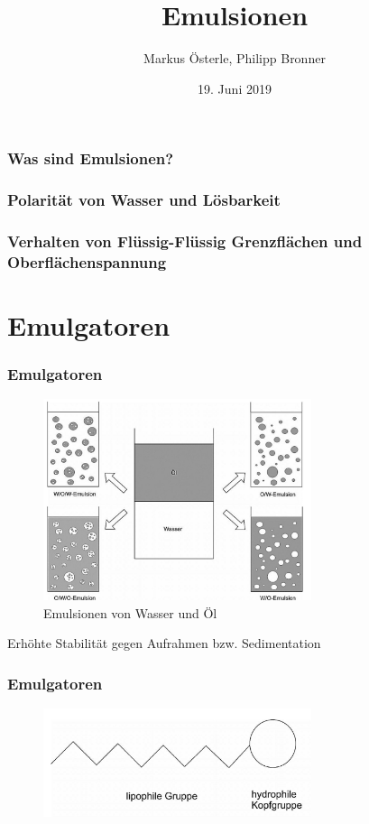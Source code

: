 \documentclass{beamer} %
\title[Emulsionen ]{Emulsionen}
\subtitle[Seminar Physik in der Küche]{}
\date[19. Juni 2019]{19. Juni 2019}
\author[Markus, Phillip und Kim]{Markus \"Osterle, Philipp Bronner}
\begin{document}
\begin{frame}
\titlepage
\end{frame}
\begin{frame}
\frametitle{Was sind Emulsionen?}
\end{frame}

\begin{frame}
\frametitle{Polarität von Wasser und Lösbarkeit}
\end{frame}

\begin{frame}
\frametitle{Verhalten von Flüssig-Flüssig Grenzflächen und Oberflächenspannung}
\end{frame}

\section{Emulgatoren}
\begin{frame}
\frametitle{Emulgatoren}
\begin{figure}
\centering
\includegraphics[width = 0.7\textwidth]{Emulsionsarten.JPG}
\caption{Emulsionen von Wasser und Öl}
\end{figure}
\begin{block}{}
Erhöhte Stabilität gegen Aufrahmen bzw. Sedimentation
\end{block}
\end{frame}

\begin{frame}
\frametitle{Emulgatoren}
\begin{figure}
\centering
\includegraphics[width = 0.7\textwidth]{EmulgatorAllgemein.JPG}
\end{figure}
\end{frame}
\end{document}
